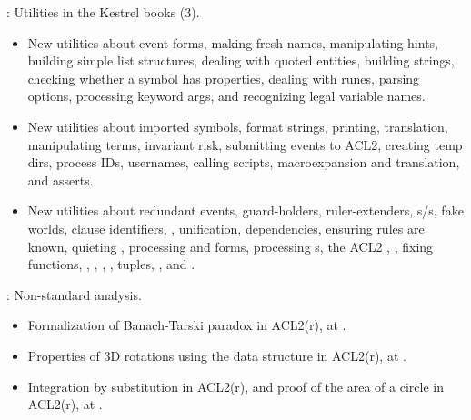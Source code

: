 \begin{frame}

\implibtitle

: Utilities in the Kestrel books (3).

\begin{itemize}

\item New utilities about event forms, making fresh names,
  manipulating hints, building simple list structures, dealing with
  quoted entities, building strings, checking whether a symbol has
  properties, dealing with runes, parsing options, processing keyword
  args, and recognizing legal variable names.

\item New utilities about imported symbols, format strings,
  printing, translation, manipulating terms, invariant risk,
  submitting events to ACL2, creating temp dirs, process IDs,
  usernames, calling scripts, macroexpansion and translation, and asserts.

\item New utilities about redundant events, guard-holders, ruler-extenders,
  s/s, fake worlds, clause identifiers,
  , unification, dependencies, ensuring rules are known,
  quieting , processing  and  forms,
  processing s, the ACL2 , ,
  fixing functions, , , ,
  , tuples, , and .

\end{itemize}

\end{frame}


\begin{frame}

\implibtitle

:
Non-standard analysis.
\begin{itemize}
\item Formalization of Banach-Tarski paradox in ACL2(r),
      at .
\item Properties of 3D rotations
      using the  data structure in ACL2(r),
      at .
\item Integration by substitution in ACL2(r),
      and proof of the area of a circle in ACL2(r),
      at .
\end{itemize}

\end{frame}

